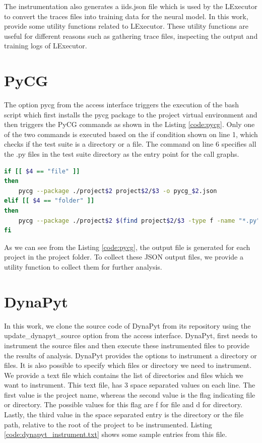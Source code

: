 The instrumentation also generates a iids.json file which is used by the LExecutor to convert the traces files into training data for the neural model.
In this work, provide some utility functions related to LExecutor.
These utility functions are useful for different reasons such as gathering trace files, inspecting the output and training logs of LExecutor.

\section{PyCG}
The option pycg from the access interface triggers the execution of the bash script which first installs the pycg package to the project virtual environment and then triggers the PyCG commands as shown in the Listing \ref{code:pycg}.
Only one of the two commands is executed based on the if condition shown on line 1, which checks if the test suite is a directory or a file.
The command on line 6 specifies all the .py files in the test suite directory as the entry point for the call graphs.
\begin{lstlisting}[caption=PyCG Execution,label=code:pycg,language=Bash]
if [[ $4 == "file" ]]
then
    pycg --package ./project$2 project$2/$3 -o pycg_$2.json
elif [[ $4 == "folder" ]]
then
    pycg --package ./project$2 $(find project$2/$3 -type f -name "*.py") -o pycg_$2.json
fi
\end{lstlisting}

As we can see from the Listing \ref{code:pycg}, the output file is generated for each project in the project folder.
To collect these JSON output files, we provide a utility function to collect them for further analysis.  

\section{DynaPyt}
In this work, we clone the source code of DynaPyt from its repository using the update\_dynapyt\_source option from the access interface.
DynaPyt, first needs to instrument the source files and then execute these instrumented files to provide the results of analysis.
DynaPyt provides the options to instrument a directory or files.
It is also possible to specify which files or directory we need to instrument.
We provide a text file which contains the list of directories and files which we want to instrument.
This text file, has 3 space separated values on each line.
The first value is the project name, whereas the second value is the flag indicating file or directory.
The possible values for this flag are f for file and d for directory.
Lastly, the third value in the space separated entry is the directory or the file path, relative to the root of the project to be instrumented.
Listing \ref{code:dynapyt_instrument.txt} shows some sample entries from this file.

